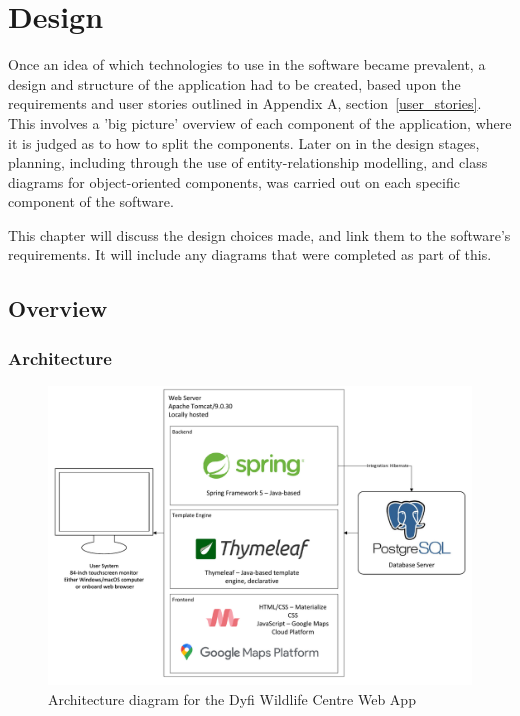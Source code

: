 \chapter{Design}

Once an idea of which technologies to use in the software became prevalent, a design and structure of the application had to be created, based upon the requirements and user stories outlined in Appendix A, section~\ref{user_stories}. This involves a 'big picture' overview of each component of the application, where it is judged as to how to split the components. Later on in the design stages, planning, including through the use of entity-relationship modelling, and class diagrams for object-oriented components, was carried out on each specific component of the software.

This chapter will discuss the design choices made, and link them to the software's requirements. It will include any diagrams that were completed as part of this.
\newpage
\section{Overview}

\subsection{Architecture}
\begin{figure}[!ht]
	\includegraphics[scale=0.5]{diagrams/architecture_diagram}
	\caption{Architecture diagram for the Dyfi Wildlife Centre Web App}
\end{figure}	

